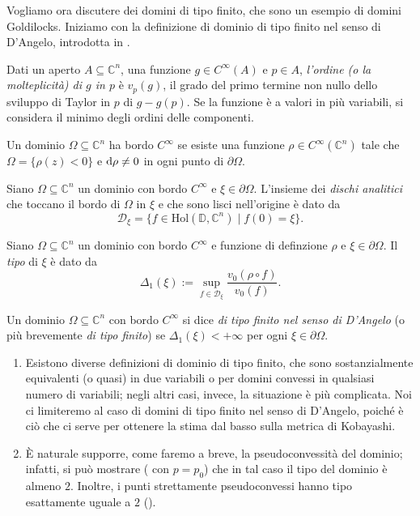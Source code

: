 Vogliamo ora discutere dei domini di tipo finito, che sono un esempio di domini Goldilocks. Iniziamo con la definizione di dominio di tipo finito nel senso di D'Angelo, introdotta in \cite{D'A}.

\begin{defn}
    Dati un aperto $A\subseteq\mathbb{C}^n$, una funzione $g\in C^\infty(A)$ e $p\in A$, \textit{l'ordine (o la molteplicità) di $g$ in $p$} è $v_p(g)$, il grado del primo termine non nullo dello sviluppo di Taylor in $p$ di $g-g(p)$. Se la funzione è a valori in più variabili, si considera il minimo degli ordini delle componenti.
\end{defn}

\begin{defn}
    Un dominio $\Omega\subseteq\mathbb{C}^n$ ha bordo $C^\infty$ se esiste una funzione $\rho\in C^\infty(\mathbb{C}^n)$ tale che $\Omega=\{\rho(z)<0\}$ e $\mathop{}\!\mathrm{d}\rho\not=0$ in ogni punto di $\partial\Omega$.
\end{defn}
    
\begin{defn} \label{discanal}
    Siano $\Omega\subseteq\mathbb{C}^n$ un dominio con bordo $C^\infty$ e $\xi\in\partial\Omega$. L'insieme dei \textit{dischi analitici} che toccano il bordo di $\Omega$ in $\xi$ e che sono lisci nell'origine è dato da
    $$\mathcal{D}_{\xi}=\{f\in\text{Hol}(\mathbb{D},\mathbb{C}^n)\mid f(0)=\xi\}.$$
\end{defn}

\begin{defn}
    Siano $\Omega\subseteq\mathbb{C}^n$ un dominio con bordo $C^\infty$ e funzione di definzione $\rho$ e $\xi\in\partial\Omega$. Il \textit{tipo} di $\xi$ è dato da
    $$\Delta_1(\xi):=\sup_{f\in\mathcal{D}_{\xi}} \frac{v_0(\rho\circ f)}{v_0(f)}.$$
\end{defn}

\begin{defn}
    Un dominio $\Omega\subseteq\mathbb{C}^n$ con bordo $C^\infty$ si dice \textit{di tipo finito nel senso di D'Angelo} (o più brevemente \textit{di tipo finito}) se $\Delta_1(\xi)<+\infty$ per ogni $\xi\in\partial\Omega$.
\end{defn}

\begin{oss}
    \begin{enumerate}
        \item Esistono diverse definizioni di dominio di tipo finito, che sono sostanzialmente equivalenti (o quasi) in due variabili o per domini convessi in qualsiasi numero di variabili; negli altri casi, invece, la situazione è più complicata. Noi ci limiteremo al caso di domini di tipo finito nel senso di D'Angelo, poiché è ciò che ci serve per ottenere la stima dal basso sulla metrica di Kobayashi.
        \item È naturale supporre, come faremo a breve, la pseudoconvessità del dominio; infatti, si può mostrare (\cite[Corollary 5.6]{D'A} con $p=p_0$) che in tal caso il tipo del dominio è almeno $2$. Inoltre, i punti strettamente pseudoconvessi hanno tipo esattamente uguale a $2$ (\cite[Corollary 5.8]{D'A}).
    \end{enumerate}
\end{oss}

